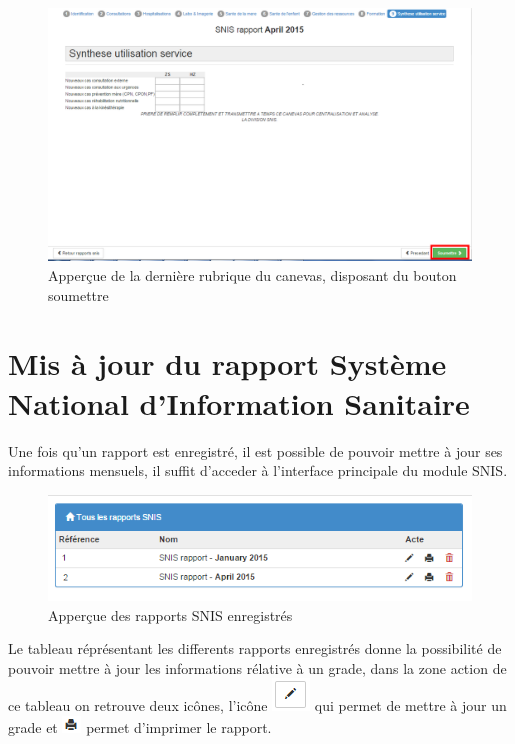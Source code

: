 \documentclass[12pt,a4paper]{report}
\begin{document}
\begin{figure}[h]
\begin{center}
\includegraphics[width=14cm]{pic/LastSubmit.png}
\end{center}
\caption{Apperçue de la dernière rubrique du canevas, disposant du bouton soumettre}
\label{Apperçue de la dernière rubrique du canevas, disposant du bouton soumettre}
\end{figure} 

\newpage
\section{Mis à jour du rapport Système National d'Information Sanitaire}

Une fois qu'un rapport est enregistré, il est possible de pouvoir mettre à jour ses informations mensuels, il suffit d'acceder à l'interface principale du module SNIS.

\begin{figure}[h]
\begin{center}
\includegraphics[width=14cm]{pic/AllSnisReport.png}
\end{center}
\caption{Apperçue des rapports SNIS enregistrés}
\label{Apperçue des rapports SNIS enregistrés}
\end{figure} 

Le tableau réprésentant les differents rapports enregistrés donne la possibilité de pouvoir mettre à jour les informations rélative à un grade, dans la zone action de ce tableau on retrouve deux icônes, l'icône \includegraphics[scale=0.7]{pic/EditBlack.png} qui permet de mettre à jour un grade et \includegraphics[scale=0.7]{pic/icoPrint.png} permet d'imprimer le rapport.
 


\tableofcontents
\end{document}
